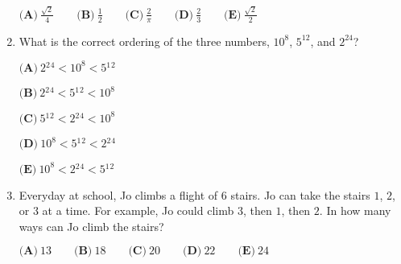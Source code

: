 \documentclass{article}
\begin{document}
\begin{enumerate}[label=\arabic*., itemsep=0.5em]
\( \textbf{(A)}\ \frac{\sqrt 2}{4}\qquad\textbf{(B)}\ \frac{1}{2}\qquad\textbf{(C)}\ \frac{2}{\pi}\qquad\textbf{(D)}\ \frac{2}{3}\qquad\textbf{(E)}\ \frac{\sqrt 2}{2} \)\par \vspace{0.5em}\item What is the correct ordering of the three numbers, \(10^8\), \(5^{12}\), and \(2^{24}\)?

\( \textbf{(A)}\ 2{}^2{}^4<10^8<5{}^1{}^2 \)

\( \textbf{(B)}\ 2{}^2{}^4<5{}^1{}^2<10^8 \)

\( \textbf{(C)}\ 5{}^1{}^2<2{}^2{}^4<10^8 \)

\( \textbf{(D)}\ 10^8<5{}^1{}^2<2{}^2{}^4\)

\( \textbf{(E)}\ 10^8<2{}^2{}^4<5{}^1{}^2 \)\par \vspace{0.5em}\item Everyday at school, Jo climbs a flight of \(6\) stairs. Jo can take the stairs \(1\), \(2\), or \(3\) at a time. For example, Jo could climb \(3\), then \(1\), then \(2\). In how many ways can Jo climb the stairs?

\( \textbf{(A)}\ 13 \qquad\textbf{(B)}\ 18\qquad\textbf{(C)}\ 20\qquad\textbf{(D)}\ 22\qquad\textbf{(E)}\ 24 \)\par \vspace{0.5em}\end{enumerate}
\end{document}

